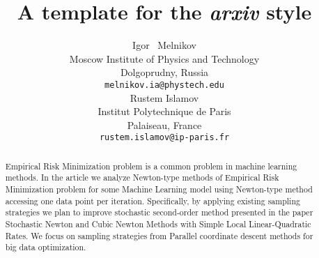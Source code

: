 \documentclass{article}
\title{A template for the \emph{arxiv} style}
\author{ Igor ~Melnikov	\\
	Moscow Institute of Physics and Technology\\
	Dolgoprudny, Russia \\
	\texttt{melnikov.ia@phystech.edu} \\
	\And
	Rustem Islamov \\
	Institut Polytechnique de Paris\\
	Palaiseau, France \\
	\texttt{rustem.islamov@ip-paris.fr} \\
}
\date{}
\begin{document}
\maketitle

\begin{abstract}
Empirical Risk Minimization problem is a common problem in machine learning methods. In the article we analyze Newton-type methods of Empirical Risk Minimization problem for some Machine Learning model using Newton-type method accessing one data point per iteration. Specifically, by applying existing sampling strategies we plan to improve stochastic second-order method presented in the paper Stochastic Newton and Cubic Newton Methods with Simple Local Linear-Quadratic Rates. We focus on sampling strategies from Parallel coordinate descent methods for big data optimization.
\end{abstract}
\end{document}
